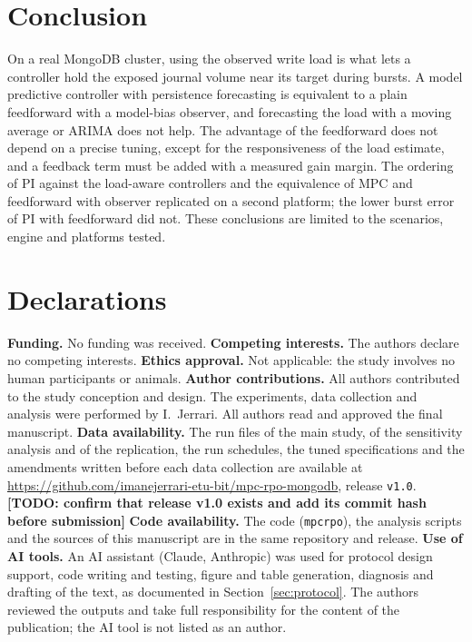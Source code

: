 \documentclass[smallextended]{svjour3}
\newcommand{\todo}[1]{\textbf{[TODO: #1]}}
\begin{document}
\section{Conclusion}\label{sec:conclusion}
On a real MongoDB cluster, using the observed write load is what lets a controller hold the exposed journal volume near its target during bursts. A model predictive controller with persistence forecasting is equivalent to a plain
feedforward with a model-bias observer, and forecasting the load with a moving average or ARIMA does not help. The advantage of the feedforward does not depend on a precise tuning, except for the responsiveness of the load estimate, and a feedback term must be added with a measured gain margin. The ordering of PI against the load-aware controllers and the equivalence of MPC and feedforward with observer replicated on a second platform; the lower burst error of PI with feedforward did not. These conclusions are limited to the scenarios, engine and platforms tested.

\section*{Declarations}
\textbf{Funding.} No funding was received. \textbf{Competing interests.} The authors declare no competing interests.
\textbf{Ethics approval.} Not applicable: the study involves no human participants or animals.
\textbf{Author contributions.} All authors contributed to the study conception and design. The experiments, data collection and analysis were performed by I.~Jerrari. All authors read and approved the final manuscript.
\textbf{Data availability.} The run files of the main study, of the sensitivity analysis and of the replication, the run schedules, the tuned specifications and the amendments written before each data collection are available at
\url{https://github.com/imanejerrari-etu-bit/mpc-rpo-mongodb}, release \texttt{v1.0}. \todo{confirm that release v1.0 exists and add its commit hash before submission}
\textbf{Code availability.} The code (\texttt{mpcrpo}), the analysis scripts and the sources of this manuscript are in the same repository and release.
\textbf{Use of AI tools.} An AI assistant (Claude, Anthropic) was used for protocol design support, code writing and testing, figure and table generation, diagnosis and drafting of the text, as documented in Section~\ref{sec:protocol}.
The authors reviewed the outputs and take full responsibility for the content of the publication; the AI tool is not listed as an author.
\end{document}
